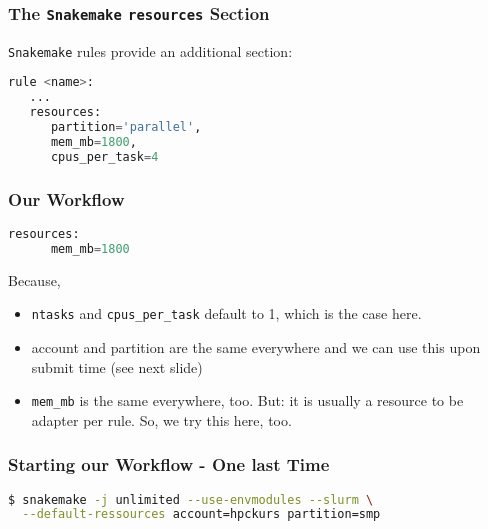 \begin{frame}[fragile]
  \frametitle{The \texttt{Snakemake} \texttt{resources} Section}
  \texttt{Snakemake} rules provide an additional section:
  \begin{lstlisting}[language=Python,style=Python]
rule <name>:
   ...
   resources:
      partition='parallel',
      mem_mb=1800,
      cpus_per_task=4
  \end{lstlisting}
\end{frame}

\begin{frame}[fragile]
  \frametitle{Our Workflow}
  \begin{lstlisting}[language=Python,style=Python]
   resources:
      mem_mb=1800
  \end{lstlisting}
  \pause
  Because,
  \begin{itemize}
   \item \texttt{ntasks} and \texttt{cpus\_per\_task} default to 1, which is the case here.
   \item account and partition are the same everywhere and we can use this upon submit time (see next slide)
   \item \texttt{mem\_mb} is the same everywhere, too. But: it is usually a resource to be adapter per rule. So, we try this here, too.
  \end{itemize}
\end{frame}

\begin{frame}[fragile]
  \frametitle{Starting our Workflow - One last Time}
  \begin{lstlisting}[language=Bash,style=Shell]
$ snakemake -j unlimited --use-envmodules --slurm \
  --default-ressources account=hpckurs partition=smp
  \end{lstlisting}
\end{frame}

